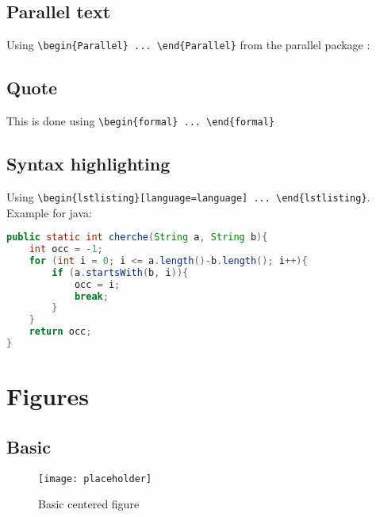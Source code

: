 \documentclass{customSynthesis}
\begin{document}
\subsection*{Parallel text}

Using \verb|\begin{Parallel} ... \end{Parallel}| from the parallel package :

\begin{Parallel}[v]{0.48\textwidth}{0.48\textwidth}
\ParallelLText{
\lipsum[1][1]
}
\ParallelRText{
\lipsum[1][2]
}
\ParallelPar
\end{Parallel}

\subsection*{Quote}

\begin{formal}
This is done using \verb|\begin{formal} ... \end{formal}|
\end{formal}

\subsection*{Syntax highlighting}

Using \verb|\begin{lstlisting}[language=language] ... \end{lstlisting}|. Example for java:\\

\begin{lstlisting}[language=java]
public static int cherche(String a, String b){
    int occ = -1;
    for (int i = 0; i <= a.length()-b.length(); i++){
        if (a.startsWith(b, i)){
            occ = i;
            break;
        }
    }
    return occ;
}
\end{lstlisting}

\section*{Figures}

\subsection*{Basic}

\begin{figure}[H]
    \centering
    \texttt{[image: placeholder]}
    \caption{Basic centered figure}
\end{figure}
\end{document}
